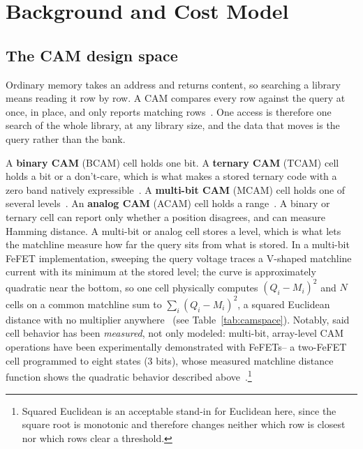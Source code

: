 \documentclass[conference]{IEEEtran}
\newcommand{\cam}{{CAM}\xspace}
\newcommand{\tcam}{{TCAM}\xspace}
\newcommand{\mcam}{{MCAM}\xspace}
\newcommand{\acam}{{ACAM}\xspace}
\newcommand{\fefet}{{FeFET}\xspace}
\newcommand{\fefets}{{FeFETs}\xspace}
\begin{document}

\section{Background and Cost Model}
\label{sec:Background}

\subsection{The CAM design space}
\label{subsec:CAMspace}
Ordinary memory takes an address and returns content, so searching a
library means reading it row by row. A \cam compares every row
against the query at once, in place, and only reports matching
rows~\cite{pagiamtzis2006cam}. One access is therefore one search of
the whole library, at any library size, and the data that moves is the
query rather than the bank.

A \textbf{binary \cam} (BCAM) cell holds one bit. A
\textbf{ternary \cam} (\tcam) cell holds a bit or a don't-care, which
is what makes a stored ternary code with a zero band natively
expressible~\cite{ni2019fetcam}. A \textbf{multi-bit \cam} (\mcam) cell
holds one of several levels~\cite{kazemi2021fefetcam}. An
\textbf{analog \cam} (\acam) cell
holds a range~\cite{li2020acam}. A binary or ternary cell can report
only whether a position disagrees, and can measure Hamming
distance. A multi-bit or analog cell stores a level,
which is what lets the matchline measure how far the query sits from
what is stored. In a multi-bit \fefet implementation, sweeping the query
voltage traces a V-shaped matchline current with its minimum at the
stored level; the curve is approximately quadratic near the bottom, so
one cell physically computes $(Q_i-M_i)^2$ and $N$ cells on a common
matchline sum to $\sum_i (Q_i-M_i)^2$, a squared Euclidean distance with
no multiplier anywhere~\cite{kazemi2021fefetcam} (see Table~\ref{tab:camspace}). Notably, said cell
behavior has been \emph{measured}, not only modeled: multi-bit,
array-level \cam operations have been experimentally demonstrated
with \fefets -- a two-\fefet cell programmed to eight states (3
bits), whose measured matchline distance function shows the
quadratic behavior described above~\cite{kazemi2022hdcfefet}.\footnote{Squared
Euclidean is an acceptable stand-in for Euclidean here, since the square
root is monotonic and therefore changes neither which row is closest nor
which rows clear a threshold.}
\end{document}
